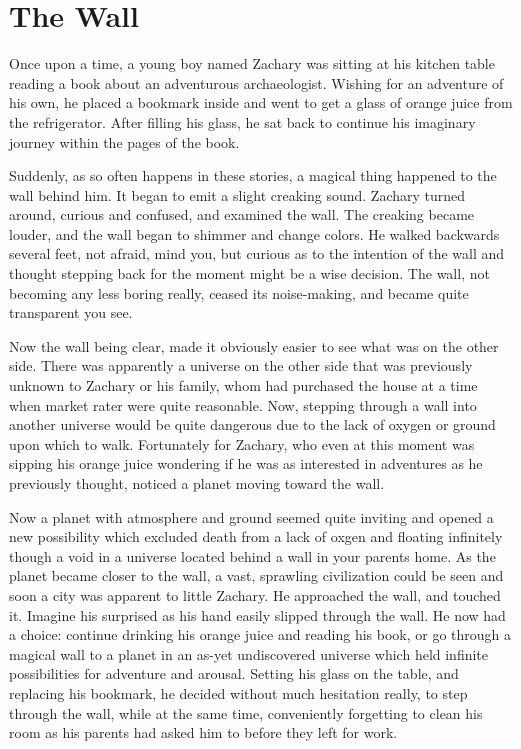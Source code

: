 \chapter{The Wall}

Once upon a time, a young boy named Zachary was sitting at his kitchen table reading a book about an adventurous archaeologist. Wishing for an adventure of his own, he placed a bookmark inside and went to get a glass of orange juice from the refrigerator. After filling his glass, he sat back to continue his imaginary journey within the pages of the book.

Suddenly, as so often happens in these stories, a magical thing happened to the wall behind him. It began to emit a slight creaking sound. Zachary turned around, curious and confused, and examined the wall. The creaking became louder, and the wall began to shimmer and change colors. He walked backwards several feet, not afraid, mind you, but curious as to the intention of the wall and thought stepping back for the moment might be a wise decision. The wall, not becoming any less boring really, ceased its noise-making, and became quite transparent you see.

Now the wall being clear, made it obviously easier to see what was on the other side. There was apparently a universe on the other side that was previously unknown to Zachary or his family, whom had purchased the house at a time when market rater were quite reasonable. Now, stepping through a wall into another universe would be quite dangerous due to the lack of oxygen or ground upon which to walk. Fortunately for Zachary, who even at this moment was sipping his orange juice wondering if he was as interested in adventures as he previously thought, noticed a planet moving toward the wall.

Now a planet with atmosphere and ground seemed quite inviting and opened a new possibility which excluded death from a lack of oxgen and floating infinitely though a void in a universe located behind a wall in your parents home. As the planet became closer to the wall, a vast, sprawling civilization could be seen and soon a city was apparent to little Zachary. He approached the wall, and touched it. Imagine his surprised as his hand easily slipped through the wall. He now had a choice: continue drinking his orange juice and reading his book, or go through a magical wall to a planet in an as-yet undiscovered universe which held infinite possibilities for adventure and arousal. Setting his glass on the table, and replacing his bookmark, he decided without much hesitation really, to step through the wall, while at the same time, conveniently forgetting to clean his room as his parents had asked him to before they left for work.

